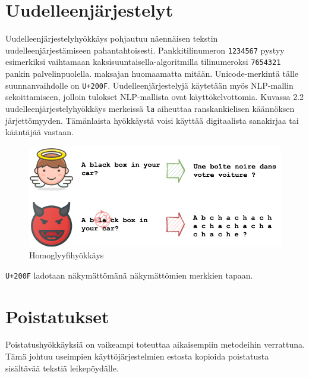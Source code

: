 \section{Uudelleenjärjestelyt}
Uudelleenjärjestelyhyökkäys pohjautuu näennäisen tekstin uudelleenjärjestämiseen pahantahtoisesti. Pankkitilinumeron \texttt{1234567} pystyy esimerkiksi vaihtamaan kaksisuuntaisella-algoritmilla tilinumeroksi \texttt{7654321} pankin palvelinpuolella. maksajan huomaamatta mitään. Unicode-merkintä tälle suunnanvaihdolle on \texttt{U+200F}. Uudelleenjärjestelyjä käytetään myös NLP-mallin sekoittamiseen, jolloin tulokset NLP-mallista ovat käyttökelvottomia. Kuvassa 2.2 uudelleenjärjestelyhyökkäys merkeissä \texttt{la} aiheuttaa ranskankielisen käännöksen järjettömyyden. Tämänlaista hyökkäystä voisi käyttää digitaalista sanakirjaa tai kääntäjää vastaan.
\begin{figure}[t]
  \includegraphics[scale=0.5]{figures/reordering.png}
  \caption{Homoglyyfihyökkäys \citep{boucher2021bad}}
\end{figure}
\texttt{U+200F} ladotaan näkymättömänä näkymättömien merkkien tapaan.


\section{Poistatukset}
Poistatushyökkäyksiä on vaikeampi toteuttaa aikaisempiin metodeihin verrattuna. Tämä johtuu useimpien käyttöjärjestelmien estosta kopioida poistatusta sisältävää tekstiä leikepöydälle.